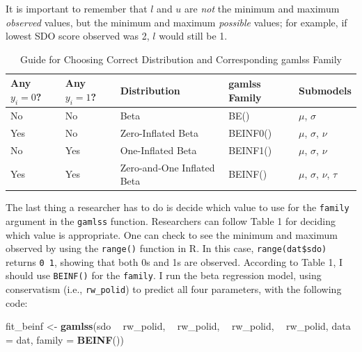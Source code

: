 \documentclass[english,,man]{apa6}
\newenvironment{Shaded}{\begin{snugshade}}{\end{snugshade}}
\newcommand{\DataTypeTok}[1]{\textcolor[rgb]{0.13,0.29,0.53}{#1}}
\newcommand{\KeywordTok}[1]{\textcolor[rgb]{0.13,0.29,0.53}{\textbf{#1}}}
\newcommand{\NormalTok}[1]{#1}
\newcommand{\OperatorTok}[1]{\textcolor[rgb]{0.81,0.36,0.00}{\textbf{#1}}}
\newcommand{\StringTok}[1]{\textcolor[rgb]{0.31,0.60,0.02}{#1}}
\begin{document}
It is important to remember that \(l\) and \(u\) are \emph{not} the minimum and maximum \emph{observed} values, but the minimum and maximum \emph{possible} values; for example, if lowest SDO score observed was 2, \(l\) would still be 1.

\begin{table}[tbp]
\begin{center}
\begin{threeparttable}
\caption{\label{tab:unnamed-chunk-14}Guide for Choosing Correct Distribution and Corresponding gamlss Family}
\begin{tabular}{lllll}
\toprule
Any $y_i = 0$? & Any $y_i = 1$? & Distribution & gamlss Family & Submodels\\
\midrule
No & No & Beta & BE() & $\mu$, $\sigma$\\
Yes & No & Zero-Inflated Beta & BEINF0() & $\mu$, $\sigma$, $\nu$\\
No & Yes & One-Inflated Beta & BEINF1() & $\mu$, $\sigma$, $\nu$\\
Yes & Yes & Zero-and-One Inflated Beta & BEINF() & $\mu$, $\sigma$, $\nu$, $\tau$\\
\bottomrule
\end{tabular}
\end{threeparttable}
\end{center}
\end{table}

The last thing a researcher has to do is decide which value to use for the \texttt{family} argument in the \texttt{gamlss} function. Researchers can follow Table 1 for deciding which value is appropriate. One can check to see the minimum and maximum observed by using the \texttt{range()} function in R. In this case, \texttt{range(dat\$sdo)} returns \texttt{0\ 1}, showing that both 0s and 1s are observed. According to Table 1, I should use \texttt{BEINF()} for the \texttt{family}. I run the beta regression model, using conservatism (i.e., \texttt{rw\_polid}) to predict all four parameters, with the following code:

\begin{Shaded}
\begin{Highlighting}[]
\NormalTok{fit_beinf <-}\StringTok{ }\KeywordTok{gamlss}\NormalTok{(sdo }\OperatorTok{~}\StringTok{ }\NormalTok{rw_polid, }\OperatorTok{~}\StringTok{ }\NormalTok{rw_polid, }\OperatorTok{~}\StringTok{ }\NormalTok{rw_polid, }\OperatorTok{~}\StringTok{ }\NormalTok{rw_polid,}
                    \DataTypeTok{data =}\NormalTok{ dat, }\DataTypeTok{family =} \KeywordTok{BEINF}\NormalTok{())}
\end{Highlighting}
\end{Shaded}
\end{document}
